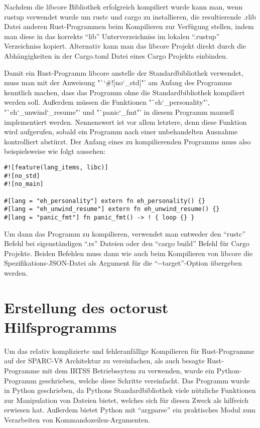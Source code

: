 Nachdem die libcore Bibliothek erfolgreich kompiliert wurde kann man, wenn rustup verwendet wurde um rustc und cargo zu installieren, 
die resultierende .rlib Datei anderen Rust-Programmen beim Kompilieren zur Verfügung stellen,
indem man diese in das korrekte "`lib"' Unterverzeichniss im lokalen "`.rustup"' Verzeichniss kopiert.
Alternativ kann man das libcore Projekt direkt durch die Abhängigkeiten in der Cargo.toml Datei
eines Cargo Projekts einbinden.

Damit ein Rust-Programm libcore anstelle der Standardbibliothek verwendet, muss man mit der Anweisung "`\char`#![no\char`_std]"'
am Anfang des Programms kenntlich machen, dass das Programm ohne die Standardbibliothek kompiliert werden soll.
Außerdem müssen die Funktionen "`eh\char`_personality"', "`eh\char`_unwind\char`_resume"' und
"`panic\char`_fmt"' in diesem Programm manuell implementiert werden. Nennenswert ist vor allem letztere, denn diese Funktion
wird aufgerufen, sobald ein Programm nach einer unbehandelten Ausnahme kontrolliert abstürzt.
Der Anfang eines zu kompilierenden Programms muss also beispielsweise wie folgt aussehen:
\begin{verbatim}
#![feature(lang_items, libc)]
#![no_std]
#![no_main]

#[lang = "eh_personality"] extern fn eh_personality() {}
#[lang = "eh_unwind_resume"] extern fn eh_unwind_resume() {}
#[lang = "panic_fmt"] fn panic_fmt() -> ! { loop {} }
\end{verbatim}

Um dann das Programm zu kompilieren, verwendet man entweder den "`rustc"' Befehl bei eigenständigen "`.rs"' Dateien oder den
"`cargo build"' Befehl für Cargo Projekte. Beiden Befehlen muss dann wie auch beim Kompilieren von libcore die 
Spezifikations-JSON-Datei als Argument für die "`-{}-target"'-Option übergeben werden. 

\section{Erstellung des octorust Hilfsprogramms}

Um das relativ komplizierte und fehleranfällige Kompilieren für Rust-Programme auf der SPARC-V8 Architektur zu vereinfachen, als
auch besagte Rust-Programme mit dem IRTSS Betriebssytem zu verwenden, wurde ein Python-Programm geschrieben, welche diese Schritte
vereinfacht. Das Programm wurde in Python geschrieben, da Pythons Standardbibliothek viele nützliche Funktionen zur Manipulation
von Dateien bietet, welches sich für diesen Zweck als hilfreich erwiesen hat. Außerdem bietet Python mit "`argparse"' ein
praktisches Modul zum Verarbeiten von Kommandozeilen-Argumenten.

